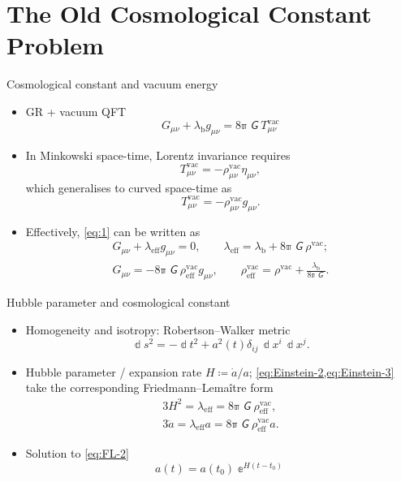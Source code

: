 \documentclass{beamer}
\newcommand{\ee}{{\Bbbe}}
\newcommand{\pp}{{\Bbbpi}}
\newcommand{\rbr}[1]{{\left(#1\right)}}
\newcommand{\rfun}[2]{{#1}\mathopen{}\left(#2\right)\mathclose{}}
\newcommand{\dd}{\Bbbd}
\newcommand{\nG}{\mitsansG} %
\begin{document}
\section{The Old Cosmological Constant Problem}

\begin{frame}{Cosmological constant and vacuum energy}
\begin{itemize}
\item GR + vacuum QFT
\begin{equation}
G_{\mu\nu} + \lambda_\text{b} g_{\mu\nu} = 8\pp\nG T^\text{vac}_{\mu\nu}
\label{eq:1}
\end{equation}
\item In Minkowski space-time, Lorentz invariance requires
\begin{equation}
T^\text{vac}_{\mu\nu} = -\rho^\text{vac}_{\mu\nu} \eta_{\mu\nu},
\end{equation}
which generalises to curved space-time as
\begin{equation}
T^\text{vac}_{\mu\nu} = -\rho^\text{vac}_{\mu\nu} g_{\mu\nu}.
\end{equation}
\item Effectively, \cref{eq:1} can be written as
\begin{align}
G_{\mu\nu} + \lambda_\text{eff} g_{\mu\nu} = 0, \qquad
\lambda_\text{eff} = \lambda_\text{b} + 8\pp\nG\rho^\text{vac};
\label{eq:Einstein-2}\\
G_{\mu\nu} = -8\pp\nG\rho^\text{vac}_\text{eff} g_{\mu\nu}, \qquad
\rho^\text{vac}_\text{eff} = \rho^\text{vac} +
\frac{\lambda_\text{b}}{8\pp\nG}
\label{eq:Einstein-3}.
\end{align}
\end{itemize}
\end{frame}

\begin{frame}{Hubble parameter and cosmological constant}
\begin{itemize}
\item Homogeneity and isotropy: Robertson--Walker metric
\begin{equation}
\dd s^2 = -\dd t^2 + \rfun{a^2}{t}\delta_{ij}\,\dd x^i\,\dd x^j.
\end{equation}
\item Hubble parameter / expansion rate $H \coloneqq \dot{a}/a$;
\cref{eq:Einstein-2,eq:Einstein-3} take the corresponding Friedmann--Lemaître
form
\begin{align}
3H^2 = \lambda_\text{eff} = 8\pp\nG\rho^\text{vac}_\text{eff},\\
3\ddot{a} = \lambda_\text{eff} a = 8\pp\nG\rho^\text{vac}_\text{eff} a.
\label{eq:FL-2}
\end{align}

\item Solution to \cref{eq:FL-2}
\begin{equation}
\rfun{a}{t} = \rfun{a}{t_0}\ee^{H \rbr{t-t_0}}
\end{equation}

\end{itemize}

\end{frame}
\end{document}
